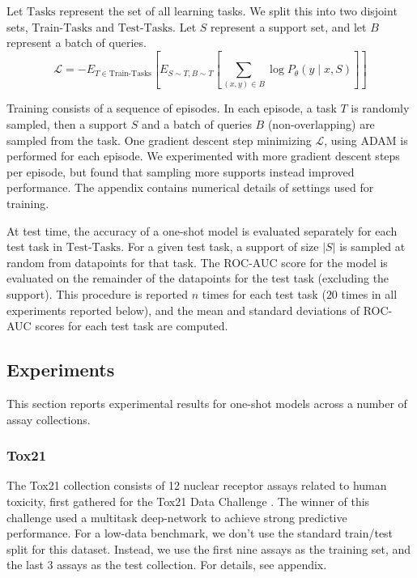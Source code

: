 Let $\text{Tasks}$ represent the set of all learning tasks. We split this into two disjoint sets, $\text{Train-Tasks}$ and $\text{Test-Tasks}$. Let $S$ represent a support set, and let $B$ represent a batch of queries.
\[
\mathcal{L} = -E_{T\in\text{Train-Tasks}} \left [ E_{S\sim T, B\sim T} \left [ \sum_{(x,y) \in B} \log P_\theta(y\mid x, S) \right ] \right ]
\]

Training consists of a sequence of episodes. In each episode, a task $T$ is randomly sampled, then a support $S$ and a batch of queries $B$ (non-overlapping) are sampled from the task. One gradient descent step minimizing $\mathcal{L}$, using ADAM \cite{kingma2014adam} is performed for each episode. We experimented with more gradient descent steps per episode, but found that sampling more supports instead improved performance. The appendix contains numerical details of settings used for training.

At test time, the accuracy of a one-shot model is evaluated separately for each test task in $\text{Test-Tasks}$. For a given test task, a support of size $|S|$ is sampled at random from datapoints for that task. The ROC-AUC score for the model is evaluated on the remainder of the datapoints for the test task (excluding the support). This procedure is reported $n$ times for each test task ($20$ times in all experiments reported below), and the mean and standard deviations of ROC-AUC scores for each test task are computed. 
  

\subsection{Experiments}
This section reports experimental results for one-shot models across a number of assay collections.
\subsubsection{Tox21}
The Tox21 collection consists of 12 nuclear receptor assays related to human toxicity, first gathered for the Tox21 Data Challenge \cite{Tox21}. The winner of this challenge used a multitask deep-network \cite{unterthiner2015toxicity} to achieve strong predictive performance. For a low-data benchmark, we don't use the standard train/test split for this dataset. Instead, we use the first nine assays as the training set, and the last 3 assays as the test collection. For details, see appendix.

